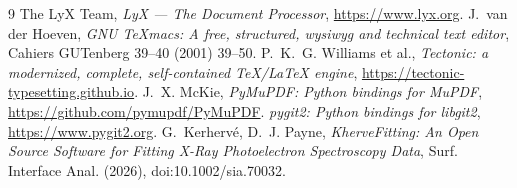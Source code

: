 \documentclass[11pt,a4paper]{article}
\begin{document}
\begin{thebibliography}{9}
 The LyX Team, \emph{LyX --- The Document Processor}, \url{https://www.lyx.org}.
 J.~van der Hoeven, \emph{GNU TeXmacs: A free, structured, wysiwyg and technical text editor}, Cahiers GUTenberg 39--40 (2001) 39--50.
 P.~K.~G. Williams et al., \emph{Tectonic: a modernized, complete, self-contained TeX/LaTeX engine}, \url{https://tectonic-typesetting.github.io}.
 J.~X. McKie, \emph{PyMuPDF: Python bindings for MuPDF}, \url{https://github.com/pymupdf/PyMuPDF}.
 \emph{pygit2: Python bindings for libgit2}, \url{https://www.pygit2.org}.
 G.~Kerhervé, D.~J. Payne, \emph{KherveFitting: An Open Source Software for Fitting X-Ray Photoelectron Spectroscopy Data}, Surf. Interface Anal. (2026), doi:10.1002/sia.70032.
\end{thebibliography}
\end{document}
